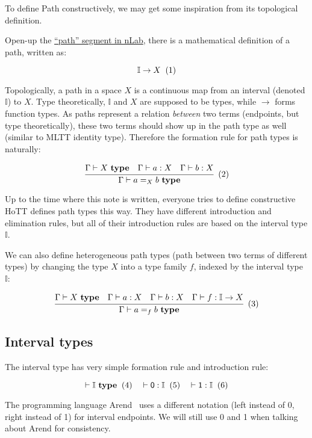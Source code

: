 To define Path constructively,
we may get some inspiration from its topological definition.

Open-up the \href{https://ncatlab.org/nlab/show/path}{``path'' segment in nLab},
there is a mathematical definition of a path, written as:

\[
  \mathbb I \rightarrow X
  \xtag
\]

Topologically, a path in a space $X$ is a continuous map
from an interval (denoted $\mathbb I$) to $X$.
Type theoretically, $\mathbb I$ and $X$ are supposed to be types,
while $\rightarrow$ forms function types.
As paths represent a relation \textit{between} two terms
(endpoints, but type theoretically),
these two terms should show up in the path type as well
(similar to MLTT identity type).
Therefore the formation rule for path types is naturally:

\[
  \cfrac{
    \Gamma \vdash X \ \textbf{type}
    \quad
    \Gamma \vdash a : X
    \quad
    \Gamma \vdash b : X
  }{\Gamma \vdash a =_X b \ \textbf{type}}
  \xtag
\]

Up to the time where this note is written,
everyone tries to define constructive HoTT defines path types this way.
They have different introduction and elimination rules,
but all of their introduction rules are
based on the interval type $\mathbb I$.

We can also define heterogeneous path types
(path between two terms of different types)
by changing the type $X$ into a type family $f$,
indexed by the interval type $\mathbb I$:

\[
  \cfrac{
    \Gamma \vdash X \ \textbf{type}
    \quad
    \Gamma \vdash a : X
    \quad
    \Gamma \vdash b : X
    \quad
    \Gamma \vdash f : \mathbb I \rightarrow X
  }{\Gamma \vdash a =_f b \ \textbf{type}}
  \xtag
\]

\subsection{Interval types}

The interval type has very simple formation rule
and introduction rule:

\[
  \vdash \mathbb I\ \textbf{type}
  \xtag \quad
  \vdash \textsf 0 : \mathbb I
  \xtag \quad
  \vdash \textsf 1 : \mathbb I
  \xtag
\]

The programming language Arend~\cite{Arend} uses a different notation
(\textsf{left} instead of \textsf 0, \textsf{right} instead of \textsf 1)
for interval endpoints.
We will still use \textsf 0 and \textsf 1 when talking
about Arend for consistency.

